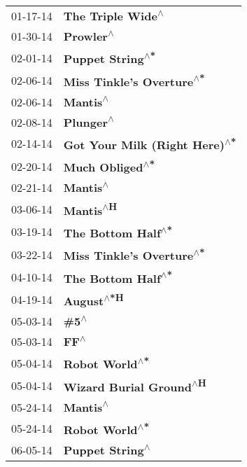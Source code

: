 \begin{supertabular}{p{0.25\columnwidth}p{0.75\columnwidth}}
 01-17-14 &              \textbf{The Triple Wide\textsuperscript{$\wedge$}} \\
 01-30-14 &                      \textbf{Prowler\textsuperscript{$\wedge$}} \\
 02-01-14 &               \textbf{Puppet String\textsuperscript{$\wedge$*}} \\
 02-06-14 &      \textbf{Miss Tinkle's Overture\textsuperscript{$\wedge$*}} \\
 02-06-14 &                       \textbf{Mantis\textsuperscript{$\wedge$}} \\
 02-08-14 &                      \textbf{Plunger\textsuperscript{$\wedge$}} \\
 02-14-14 &  \textbf{Got Your Milk (Right Here)\textsuperscript{$\wedge$*}} \\
 02-20-14 &                \textbf{Much Obliged\textsuperscript{$\wedge$*}} \\
 02-21-14 &                       \textbf{Mantis\textsuperscript{$\wedge$}} \\
 03-06-14 &                      \textbf{Mantis\textsuperscript{$\wedge$H}} \\
 03-19-14 &             \textbf{The Bottom Half\textsuperscript{$\wedge$*}} \\
 03-22-14 &      \textbf{Miss Tinkle's Overture\textsuperscript{$\wedge$*}} \\
 04-10-14 &             \textbf{The Bottom Half\textsuperscript{$\wedge$*}} \\
 04-19-14 &                     \textbf{August\textsuperscript{$\wedge$*H}} \\
 05-03-14 &                          \textbf{\#5\textsuperscript{$\wedge$}} \\
 05-03-14 &                           \textbf{FF\textsuperscript{$\wedge$}} \\
 05-04-14 &                 \textbf{Robot World\textsuperscript{$\wedge$*}} \\
 05-04-14 &        \textbf{Wizard Burial Ground\textsuperscript{$\wedge$H}} \\
 05-24-14 &                       \textbf{Mantis\textsuperscript{$\wedge$}} \\
 05-24-14 &                 \textbf{Robot World\textsuperscript{$\wedge$*}} \\
 06-05-14 &                \textbf{Puppet String\textsuperscript{$\wedge$}} \\

\end{supertabular}

